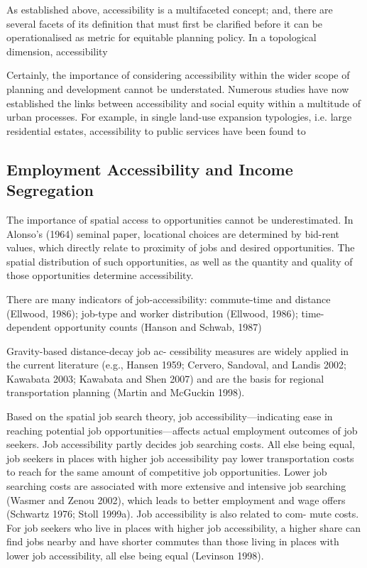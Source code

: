 As established above, accessibility is a multifaceted concept; and, there are several facets of its definition that must first be clarified before it can be operationalised as metric for equitable planning policy. In a topological dimension, accessibility 

Certainly, the importance of considering accessibility within the wider scope of planning and development cannot be understated. Numerous studies have now established the links between accessibility and social equity within a multitude of urban processes. For example, in single land-use expansion typologies, i.e. large residential estates, accessibility to public services have been found to 

\subsection{Employment Accessibility and Income Segregation} 

The importance of spatial access to opportunities cannot be underestimated. In Alonso's (1964) seminal paper, locational choices are determined by bid-rent values, which directly relate to proximity of jobs and desired opportunities. The spatial distribution of such opportunities, as well as the quantity and quality of those opportunities determine accessibility.

There are many indicators of job-accessibility: commute-time and distance (Ellwood, 1986); job-type and worker distribution (Ellwood, 1986); time-dependent opportunity counts (Hanson and Schwab, 1987)

Gravity-based distance-decay job ac- cessibility measures are widely applied in the current literature (e.g., Hansen 1959; Cervero, Sandoval, and Landis 2002; Kawabata 2003; Kawabata and Shen 2007) and are the basis for regional transportation planning (Martin and McGuckin 1998). 

Based  on  the  spatial  job  search  theory, job accessibility—indicating ease in reaching potential job opportunities—affects actual employment outcomes of job seekers. Job accessibility partly decides job searching costs. All else being equal, job seekers in places with higher job accessibility pay lower transportation costs to reach for the same amount of competitive job opportunities. Lower job searching costs are associated with more extensive and intensive job searching (Wasmer and Zenou 2002), which leads to better employment and wage offers (Schwartz 1976; Stoll 1999a). Job accessibility is also related to com- mute costs. For job seekers who live in places with higher job accessibility, a higher share can find jobs nearby and have shorter commutes than those living in places with lower job accessibility, all else being equal (Levinson 1998). 

